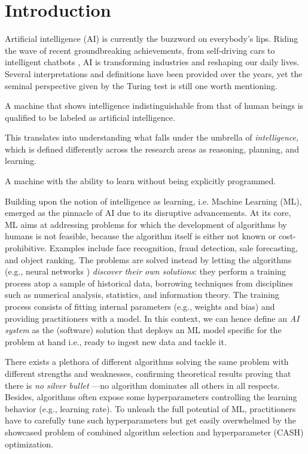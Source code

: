 \chapter{Introduction}
\label{chap:intro}

Artificial intelligence (AI) is currently the buzzword on everybody's lips.
Riding the wave of recent groundbreaking achievements, from self-driving cars \citep{} to intelligent chatbots \citep{}, AI is transforming industries and reshaping our daily lives.
Several interpretations and definitions have been provided over the years, yet the seminal perspective given by the Turing test \citep{turing1980computing} is still one worth mentioning.
\begin{definition}
A machine that shows intelligence indistinguishable from that of human beings is qualified to be labeled as artificial intelligence.
\end{definition}
This translates into understanding what falls under the umbrella of \textit{intelligence}, which is defined differently across the research areas as reasoning, planning, and learning.
\begin{definition}
A machine with the ability to learn without being explicitly programmed.
\end{definition}
Building upon the notion of intelligence as learning, i.e. Machine Learning (ML), emerged as the pinnacle of AI due to its disruptive advancements.
At its core, ML aims at addressing problems for which the development of algorithms by humans is not feasible, because the algorithm itself is either not known or cost-prohibitive.
Examples include face recognition, fraud detection, sale forecasting, and object ranking.
The problems are solved instead by letting the algorithms (e.g., neural networks \cite{nn}) \textit{discover their own solutions}: they perform a training process atop a sample of historical data, borrowing techniques from disciplines such as numerical analysis, statistics, and information theory.
The training process consists of fitting internal parameters (e.g., weights and bias) and providing practitioners with a model.
In this context, we can hence define an \textit{AI system} as the (software) solution that deploys an ML model specific for the problem at hand i.e., ready to ingest new data and tackle it.

There exists a plethora of different algorithms solving the same problem with different strengths and weaknesses, confirming theoretical results proving that there is \textit{no silver bullet} \cite{kerschke2019automated}---no algorithm dominates all others in all respects.
Besides, algorithms often expose some hyperparameters controlling the learning behavior (e.g., learning rate).
To unleash the full potential of ML, practitioners have to carefully tune such hyperparameters but get easily overwhelmed by the showcased problem of combined algorithm selection and hyperparameter (CASH) optimization.

